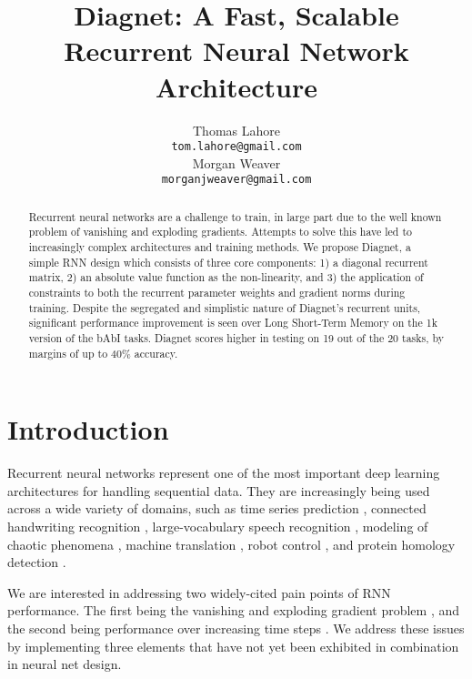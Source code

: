 \documentclass{article}
\title{Diagnet: A Fast, Scalable Recurrent Neural Network Architecture}
\author{
Thomas Lahore\\
\texttt{tom.lahore@gmail.com}\\
\And
Morgan Weaver\\
\texttt{morganjweaver@gmail.com}
}
\begin{document}
\maketitle
\begin{abstract}

Recurrent neural networks are a challenge to train, in large part due to the well known problem of vanishing and exploding gradients. Attempts to solve this have led to increasingly complex architectures and training methods. We propose Diagnet, a simple RNN design which consists of three core components: 1) a diagonal recurrent matrix, 2) an absolute value function as the non-linearity, and 3) the application of constraints to both the recurrent parameter weights and gradient norms during training. Despite the segregated and simplistic nature of Diagnet's recurrent units, significant performance improvement is seen over Long Short-Term Memory on the 1k version of the bAbI tasks. Diagnet scores higher in testing on 19 out of the 20 tasks, by margins of up to 40\% accuracy.
  

\end{abstract}

\section{Introduction}

Recurrent neural networks represent one of the most important deep learning architectures for handling sequential data.  They are increasingly being used across a wide variety of domains, such as time series prediction \citet{Giles2001}, connected handwriting recognition \citet{graves2009offline}, large-vocabulary speech recognition \citet{SakSB14}, modeling of chaotic phenomena \citet{PhysRevLett.120.024102}, machine translation \citet{bahdanau2014neural, mikolov2010recurrent}, robot control \citet{oubbati2005kinematic}, and protein homology detection \citet{el2008predicting}.
      
We are interested in addressing two widely-cited pain points of RNN performance.  The first being the vanishing and exploding gradient problem \citet{pascanu2013difficulty, bengio2013advances, pascanu2012understanding}, and the second being performance over increasing time steps \citet{Gers2000, hoch97}.  We address these issues by implementing three elements that have not yet been exhibited in combination in neural net design. 
\end{document}
